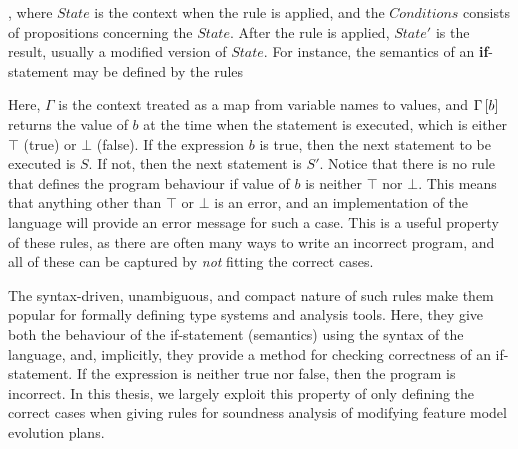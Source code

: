 \begin{prooftree}
\end{prooftree}

, where $State$ is the context when the rule is applied, and the $Conditions$ consists of propositions concerning the $State$. After the rule is applied, $State'$ is the result, usually a modified version of $State$. For instance, the semantics of an \textbf{if}-statement may be defined by the rules

\begin{minipage}{0.5\textwidth}
   \footnotesize
\begin{prooftree}
\end{prooftree}
\end{minipage}
\begin{minipage}{0.5\textwidth}
   \footnotesize
\begin{prooftree}
\end{prooftree}
\end{minipage}

Here, $\Gamma$ is the context treated as a map from variable names to values, and $\lookup{\Gamma}{b}$ returns the value of $b$ at the time when the statement is executed, which is either $\top$ (true) or $\bot$ (false). If the expression $b$ is true, then the next statement to be executed is $S$. If not, then the next statement is $S'$. Notice that there is no rule that defines the program behaviour if value of $b$ is neither $\top$ nor $\bot$. This means that anything other than $\top$ or $\bot$ is an error, and an implementation of the language will provide an error message for such a case. This is a useful property of these rules, as there are often many ways to write an incorrect program, and all of these can be captured by \emph{not} fitting the correct cases.

The syntax-driven, unambiguous, and compact nature of such rules make them popular for formally defining type systems and analysis tools. Here, they give both the behaviour of the if-statement (semantics) using the syntax of the language, and, implicitly, they provide a method for checking correctness of an if-statement. If the expression is neither true nor false, then the program is incorrect. In this thesis, we largely exploit this property of only defining the correct cases when giving rules for soundness analysis of modifying feature model evolution plans.

